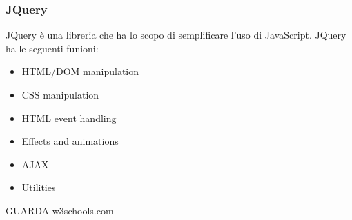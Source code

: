 \subsubsection{JQuery}
JQuery è una libreria che ha lo scopo di semplificare l'uso di JavaScript.
JQuery ha le seguenti funioni:
\begin{itemize}
    \item HTML/DOM manipulation
    \item CSS manipulation
    \item HTML event handling
    \item Effects and animations
    \item AJAX
    \item Utilities
\end{itemize}

GUARDA w3schools.com